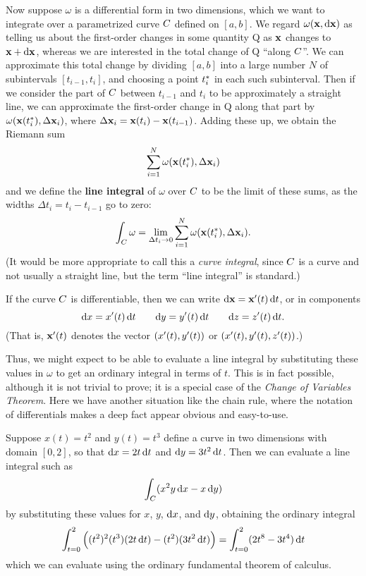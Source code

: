 Now suppose $\omega$ is a differential form in two dimensions, which we want to integrate over a parametrized curve $C$ defined on $[a,b]$.
We regard $\omega(\mathbf{x},{\mathrm{d} \mathbf{x}})$ as telling us about the first-order changes in some quantity Q as $\mathbf{x}$ changes to $\mathbf{x}+{\mathrm{d} \mathbf{x}}$, whereas we are interested in the total change of Q ``along $C$''.
We can approximate this total change by dividing $[a,b]$ into a large number $N$ of subintervals $[t_{i-1},t_i]$, and choosing a point ${t}_{i}^*$ in each such subinterval.
Then if we consider the part of $C$ between $t_{i-1}$ and $t_i$ to be approximately a straight line, we can approximate the first-order change in Q along that part by $\omega(\mathbf{x}({t}_{i}^*),\Delta \mathbf{x}_i)$, where $\Delta\mathbf{x}_i = \mathbf{x}(t_i)-\mathbf{x}(t_{i-1})$.
Adding these up, we obtain the Riemann sum
\[ \sum_{i=1}^N \omega(\mathbf{x}({t}_{i}^*),\Delta \mathbf{x}_i) \]
and we define the \textbf{line integral} of $\omega$ over $C$ to be the limit of these sums, as the widths $\Delta t_i = t_i - t_{i-1}$ go to zero:
\begin{equation}
  \int_{C} \omega = \lim_{\Delta t_i \to 0} \sum_{i=1}^N \omega(\mathbf{x}({t}_{i}^*),\Delta \mathbf{x}_i).\label{eq:line-integral}
\end{equation}
(It would be more appropriate to call this a \textit{curve integral}, since $C$ is a curve and not usually a straight line, but the term ``line integral'' is standard.)

If the curve $C$ is differentiable, then we can write $\mathrm{d}\mathbf{x} = \mathbf{x}'(t)\,{\mathrm{d} t}$, or in components
\[{\mathrm{d} x} = x'(t)\,{\mathrm{d} t} \qquad {\ensuremath{\mathrm{d} y}} = y'(t) \,{\mathrm{d} t} \qquad {\ensuremath{\mathrm{d} z}} = z'(t)\,{\mathrm{d} t}. \]
(That is, $\mathbf{x}'(t)$ denotes the vector $(x'(t),y'(t))$ or $(x'(t),y'(t),z'(t))$.)

Thus, we might expect to be able to evaluate a line integral by substituting these values in $\omega$ to get an ordinary integral in terms of $t$.
This is in fact possible, although it is not trivial to prove; it is a special case of the \emph{Change of Variables Theorem}.
Here we have another situation like the chain rule, where the notation of differentials makes a deep fact appear obvious and easy-to-use.

\begin{eg}\label{eg:lineint-cov}
  Suppose $x(t) = t^2$ and $y(t) = t^3$ define a curve in two dimensions with domain $[0,2]$, so that ${\mathrm{d} x} = 2t\,{\mathrm{d} t}$ and ${\mathrm{d} y} = 3t^2\,{\mathrm{d} t}$.
  Then we can evaluate a line integral such as
  \[ \int_{C} (x^2 y \,{\mathrm{d} x} - x \,{\mathrm{d} y}) \]
  by substituting these values for $x$, $y$, ${\mathrm{d} x}$, and ${\mathrm{d} y}$, obtaining the ordinary integral
  \[ \int_{t=0}^2 \Big( (t^2)^2(t^3)(2t\,{\mathrm{d} t}) - (t^2)(3t^2\,{\mathrm{d} t})\Big)
  = \int_{t=0}^2 (2t^8 - 3t^4)\,{\mathrm{d} t}\]
  which we can evaluate using the ordinary fundamental theorem of calculus.
\end{eg}

